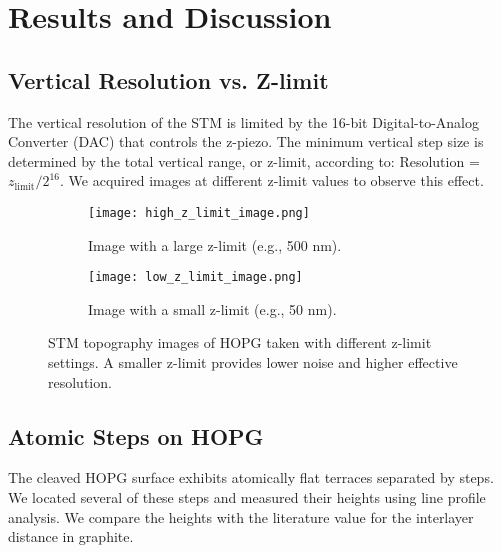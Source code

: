 \documentclass[12pt,a4paper]{article}
\begin{document}
\section{Results and Discussion}

\subsection{Vertical Resolution vs. Z-limit}
The vertical resolution of the STM is limited by the 16-bit Digital-to-Analog Converter (DAC) that controls the z-piezo. The minimum vertical step size is determined by the total vertical range, or z-limit, according to: Resolution = $z_{\text{limit}} / 2^{16}$. We acquired images at different z-limit values to observe this effect.

\begin{figure}[H]
    \centering
    \begin{subfigure}[b]{0.48\linewidth}
        \centering
        \texttt{[image: high\_z\_limit\_image.png]}
        \caption{Image with a large z-limit (e.g., 500 nm).}
    \end{subfigure}\hfill
    \begin{subfigure}[b]{0.48\linewidth}
        \centering
        \texttt{[image: low\_z\_limit\_image.png]}
        \caption{Image with a small z-limit (e.g., 50 nm).}
    \end{subfigure}
    \caption{STM topography images of HOPG taken with different z-limit settings. A smaller z-limit provides lower noise and higher effective resolution.}
    \label{fig:z-limit}
\end{figure}


\subsection{Atomic Steps on HOPG}
The cleaved HOPG surface exhibits atomically flat terraces separated by steps. We located several of these steps and measured their heights using line profile analysis. We compare the heights with the literature value for the interlayer distance in graphite.
\end{document}
